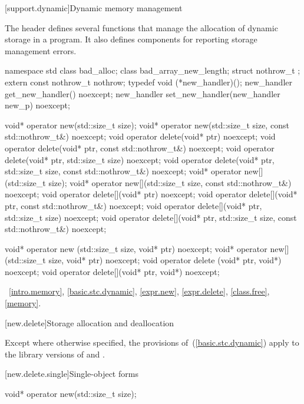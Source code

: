 [support.dynamic]{Dynamic memory management}

\pnum
The header
defines several
functions that manage the allocation of dynamic storage in a program.
It also defines components for reporting storage management errors.

%
%

\begin{codeblock}
namespace std {
  class bad_alloc;
  class bad_array_new_length;
  struct nothrow_t {};
  extern const nothrow_t nothrow;
  typedef void (*new_handler)();
  new_handler get_new_handler() noexcept;
  new_handler set_new_handler(new_handler new_p) noexcept;
}

void* operator new(std::size_t size);
void* operator new(std::size_t size, const std::nothrow_t&) noexcept;
void  operator delete(void* ptr) noexcept;
void  operator delete(void* ptr, const std::nothrow_t&) noexcept;
void  operator delete(void* ptr, std::size_t size) noexcept;
void  operator delete(void* ptr, std::size_t size,
                      const std::nothrow_t&) noexcept;
void* operator new[](std::size_t size);
void* operator new[](std::size_t size, const std::nothrow_t&) noexcept;
void  operator delete[](void* ptr) noexcept;
void  operator delete[](void* ptr, const std::nothrow_t&) noexcept;
void  operator delete[](void* ptr, std::size_t size) noexcept;
void  operator delete[](void* ptr, std::size_t size,
                        const std::nothrow_t&) noexcept;

void* operator new  (std::size_t size, void* ptr) noexcept;
void* operator new[](std::size_t size, void* ptr) noexcept;
void  operator delete  (void* ptr, void*) noexcept;
void  operator delete[](void* ptr, void*) noexcept;
\end{codeblock}

\xref~\ref{intro.memory}, \ref{basic.stc.dynamic},
\ref{expr.new}, \ref{expr.delete}, \ref{class.free},
\ref{memory}.

[new.delete]{Storage allocation and deallocation}

\pnum
Except where otherwise specified, the provisions of~(\ref{basic.stc.dynamic})
apply to the library versions of  and .

[new.delete.single]{Single-object forms}

%
\begin{itemdecl}
void* operator new(std::size_t size);
\end{itemdecl}

